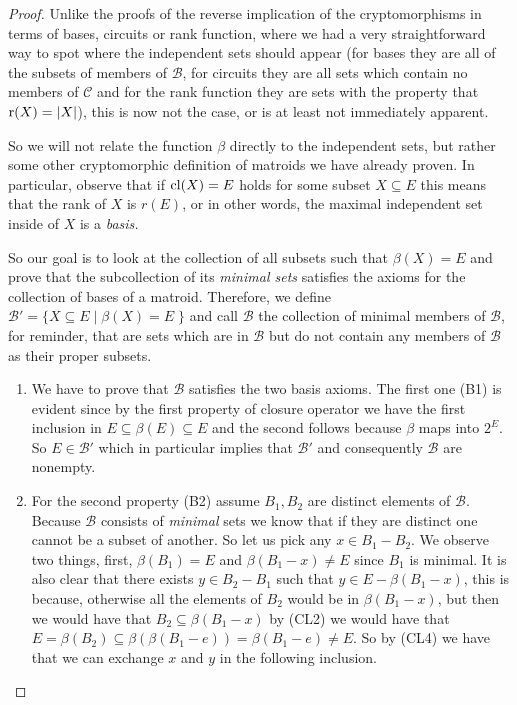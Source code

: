 \begin{proof}
    Unlike the proofs of the reverse implication of the cryptomorphisms in terms of bases, circuits or rank function, where we had a very straightforward way to spot where the independent sets should appear (for bases they are all of the subsets of members of $\mathcal{B}$, for circuits they are all sets which contain no members of $\mathcal{C}$ and for the rank function they are sets with the property that $\operatorname{r}(X) = |X|$), this is now not the case, or is at least not immediately apparent.

    So we will not relate the function $\beta$ directly to the independent sets, but rather some other cryptomorphic definition of matroids we have already proven. In particular, observe that if $\mathrm{cl}(X) = E$ holds for some subset $X \subseteq E$ this means that the rank of $X$ is $r(E)$, or in other words, the maximal independent set inside of $X$ is a \textit{basis.}

    So our goal is to look at the collection of all subsets such that $\beta(X)= E$ and prove that the subcollection of its \textit{minimal sets} satisfies the axioms for the collection of bases of a matroid. Therefore, we define $\mathcal{B}' = \{X \subseteq E\; |\; \beta(X) = E\;\}$ and call $\mathcal{B}$ the collection of minimal members of $\mathcal{B}$, for reminder, that are sets which are in $\mathcal{B}$ but do not contain any members of $\mathcal{B}$ as their proper subsets.


\begin{enumerate}

\item We have to prove that $\mathcal{B}$ satisfies the two basis axioms. The first one (B1) is evident since by the first property of closure operator we have the first inclusion in $E\subseteq\beta(E) \subseteq E$ and the second follows because $\beta$ maps into $2^E$. So $E \in \mathcal{B}'$ which in particular implies that $\mathcal{B}'$ and consequently $\mathcal{B}$ are nonempty.

\item
    For the second property (B2) assume $B_1, B_2$ are distinct elements of $\mathcal{B}.$ Because $\mathcal{B}$ consists of \textit{minimal} sets we know that if they are distinct one cannot be a subset of another. So let us pick any $x \in B_1 - B_2$.
    We observe two things, first, $\beta(B_1) = E$ and $\beta(B_1 - x) \neq E$ since $B_1$ is minimal. It is also clear that there exists $y \in B_2 - B_1$ such that $y \in E - \beta(B_1 - x)$, this is because, otherwise all the elements of $B_2$ would be in $\beta(B_1-x)$, but then we would have that $B_2 \subseteq \beta(B_1 - x)$ by (CL2) we would have that $E = \beta(B_2)\subseteq \beta(\beta(B_1 - e)) = \beta(B_1 - e) \neq E$. So by (CL4) we have that we can exchange $x$ and $y$ in the following inclusion.
    

\end{enumerate}
\end{proof}
